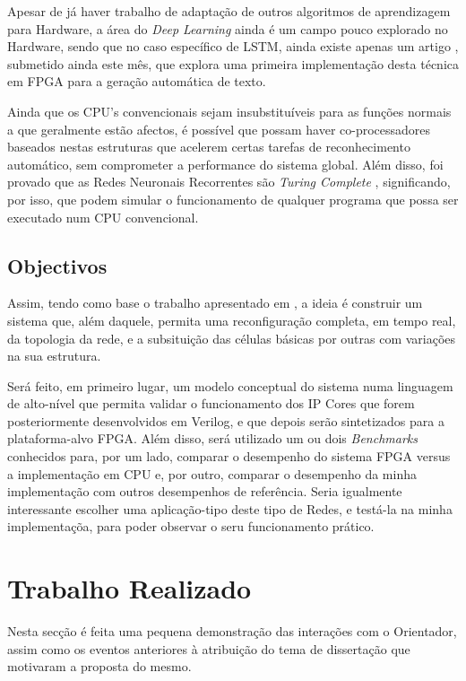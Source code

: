 \documentclass[a4paper, onecolumn, 10pt]{article}
\begin{document}
	Apesar de já haver trabalho de adaptação de outros algoritmos de aprendizagem para Hardware, a área do \textit{Deep Learning} ainda é um campo pouco explorado no Hardware, sendo que no caso específico de LSTM, ainda existe apenas um artigo \autocite{fpgalstm}, submetido ainda este mês, que explora uma primeira implementação desta técnica em FPGA para a geração automática de texto. 
	
	Ainda que os CPU's convencionais sejam insubstituíveis para as funções normais a que geralmente estão afectos, é possível que possam haver co-processadores baseados nestas estruturas que acelerem certas tarefas de reconhecimento automático, sem comprometer a performance do sistema global. Além disso, foi provado  que as Redes Neuronais Recorrentes são \textit{Turing Complete} \autocite{turingcompletenessRNN}\autocite{turingcompletenessRNN2}, significando, por isso, que podem simular o funcionamento de qualquer programa que possa ser executado num CPU convencional.

	\subsection{Objectivos}
	Assim, tendo como base o trabalho apresentado em \autocite{fpgalstm}, a ideia é construir um sistema que, além daquele, permita uma reconfiguração completa, em tempo real, da topologia da rede, e a subsituição das células básicas por outras com variações na sua estrutura.
	
	Será feito, em primeiro lugar, um modelo conceptual do sistema numa linguagem de alto-nível que permita validar o funcionamento dos IP Cores que forem posteriormente desenvolvidos em Verilog, e que depois serão sintetizados para a plataforma-alvo FPGA. Além disso, será utilizado um ou dois \textit{Benchmarks} conhecidos para, por um lado, comparar o desempenho do sistema FPGA versus a implementação em CPU e, por outro, comparar o desempenho da minha implementação com outros desempenhos de referência. Seria igualmente interessante escolher uma aplicação-tipo deste tipo de Redes, e testá-la na minha implementaçõa, para poder observar o seru funcionamento prático.
	

\section{Trabalho Realizado}
Nesta secção é feita uma pequena demonstração das interações com o Orientador, assim como os eventos anteriores à atribuição do tema de dissertação que motivaram a proposta do mesmo.
\end{document}
